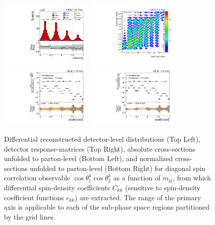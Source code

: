 \clearpage
\begin{figure}[htb]
\begin{center}
 \includegraphics[width=0.40\textwidth]{fig_fullRun2UL/controlplots/combined/Hyp_LLBarCkk_vs_TTBarMass.pdf}
 \includegraphics[width=0.40\textwidth]{fig_fullRun2UL/unfolding/combined/ResponseMatrix_c_kk_mttbar.pdf} \\
 \includegraphics[width=0.40\textwidth]{fig_fullRun2UL/unfolding/combined/UnfoldedResults_c_kk_mttbar.pdf}
 \includegraphics[width=0.40\textwidth]{fig_fullRun2UL/unfolding/combined/UnfoldedResultsNorm_c_kk_mttbar.pdf} \\
\label{fig:c_kk_mttbar}
\caption{Differential reconstructed detector-level distributions (Top Left), detector response-matrices (Top Right), absolute cross-sections unfolded to parton-level (Bottom Left), and normalized cross-sections unfolded to parton-level (Bottom Right) for diagonal spin correlation observable $\cos\theta_{1}^{k}\cos\theta_{2}^{k}$ as a function of $m_{t\bar{t}}$, from which differential spin-density coefficients $C_{kk}$ (sensitive to spin-density coefficient functions $c_{k k}$) are extracted.  The range of the primary axis is applicable to each of the sub-phase space regions partitioned by the grid lines.}
\end{center}
\end{figure}
